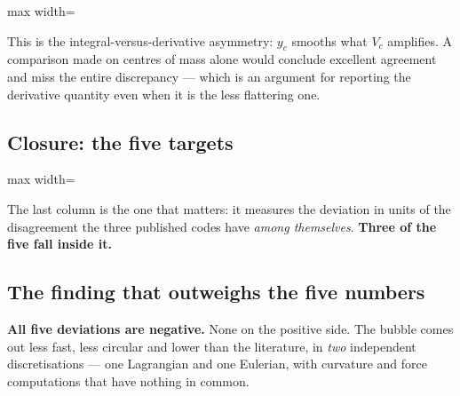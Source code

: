 \begin{adjustbox}{max width=\linewidth}
\end{adjustbox}
\label{tab:divergencia}

This is the integral-versus-derivative asymmetry: $y_c$ smooths what $V_c$
amplifies. A comparison made on centres of mass alone would conclude excellent
agreement and miss the entire discrepancy --- which is an argument for
reporting the derivative quantity even when it is the less flattering one.

\subsection{Closure: the five targets}

\begin{adjustbox}{max width=\linewidth}
\end{adjustbox}

The last column is the one that matters: it measures the deviation in units of
the disagreement the three published codes have \emph{among themselves}.
\textbf{Three of the five fall inside it.}

\subsection{The finding that outweighs the five numbers}

\textbf{All five deviations are negative.} None on the positive side. The
bubble comes out less fast, less circular and lower than the literature, in
\emph{two} independent discretisations --- one Lagrangian and one Eulerian,
with curvature and force computations that have nothing in common.

